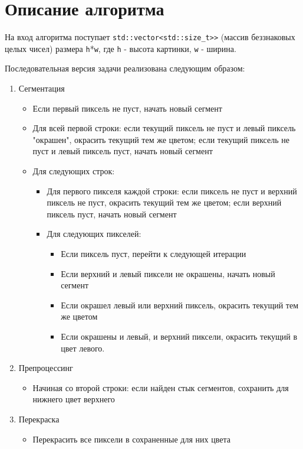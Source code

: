 \documentclass{report}
\begin{document}
\newpage

\section*{Описание алгоритма}
На вход алгоритма поступает \verb|std::vector<std::size_t>>| (массив беззнаковых целых чисел) размера \verb|h|*\verb|w|, где \verb|h| - высота картинки, \verb|w| - ширина.
\par Последовательная версия задачи реализована следующим образом:
\begin{enumerate}
	\item Сегментация
	\begin{itemize}
		\item Если первый пиксель не пуст, начать новый сегмент
		\item Для всей первой строки: если текущий пиксель не пуст и левый пиксель "окрашен", окрасить текущий тем же цветом; если текущий пиксель не пуст и левый пиксель пуст, начать новый сегмент
		\item Для следующих строк:
		\begin{itemize}
			\item Для первого пикселя каждой строки: если пиксель не пуст и верхний пиксель не пуст, окрасить текущий тем же цветом; если верхний пиксель пуст, начать новый сегмент
			\item Для следующих пикселей:
			\begin{itemize}
				\item Если пиксель пуст, перейти к следующей итерации
				\item Если верхний и левый пиксели не окрашены, начать новый сегмент
				\item Если окрашел левый или верхний пиксель, окрасить текущий тем же цветом
				\item Если окрашены и левый, и верхний пиксели, окрасить текущий в цвет левого.
			\end{itemize}
		\end{itemize}
	\end{itemize}
\item Препроцессинг
\begin{itemize}
	\item Начиная со второй строки: если найден стык сегментов, сохранить для нижнего цвет верхнего
\end{itemize}
\item Перекраска
\begin{itemize}
	\item Перекрасить все пиксели в сохраненные для них цвета
\end{itemize}
\end{enumerate}
\end{document}
